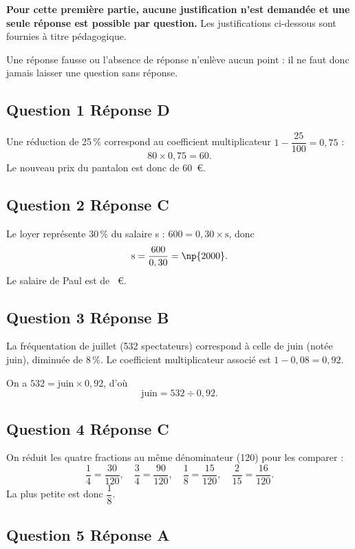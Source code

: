 \textbf{Pour cette première partie, aucune justification n'est demandée et une seule réponse est possible par question.} Les justifications ci-dessous sont fournies à titre pédagogique.

Une réponse fausse ou l'absence de réponse n'enlève aucun point : il ne faut donc jamais laisser une question sans réponse.

\subsection*{Question 1 \quad Réponse D}

Une réduction de 25\,\% correspond au coefficient multiplicateur
$1 - \dfrac{25}{100} = 0,75$ :
\[80 \times 0,75 = 60.\]
Le nouveau prix du pantalon est donc de 60~\euro.

\subsection*{Question 2 \quad Réponse C}

Le loyer représente 30\,\% du salaire s : $600 = 0,30 \times \text{s}$, donc
\[ \text{s} = \dfrac{600}{0,30} = \np{2000}.\]
Le salaire de Paul est de ~\euro.

\subsection*{Question 3 \quad Réponse B}

La fréquentation de juillet (532 spectateurs) correspond à celle de juin (notée juin), diminuée de 8\,\%. Le coefficient multiplicateur associé est $1-0,08=0,92$.

On a
$532 = \text{juin} \times 0,92$, d'où
\[\text{juin} = 532 \div 0,92.\]

\subsection*{Question 4 \quad Réponse C}

On réduit les quatre fractions au même dénominateur (120) pour les comparer :
\[\dfrac{1}{4} = \dfrac{30}{120}, \quad \dfrac{3}{4} = \dfrac{90}{120}, \quad
\dfrac{1}{8} = \dfrac{15}{120}, \quad \dfrac{2}{15} = \dfrac{16}{120}.\]
La plus petite est donc $\dfrac{1}{8}$.

\subsection*{Question 5 \quad Réponse A}

